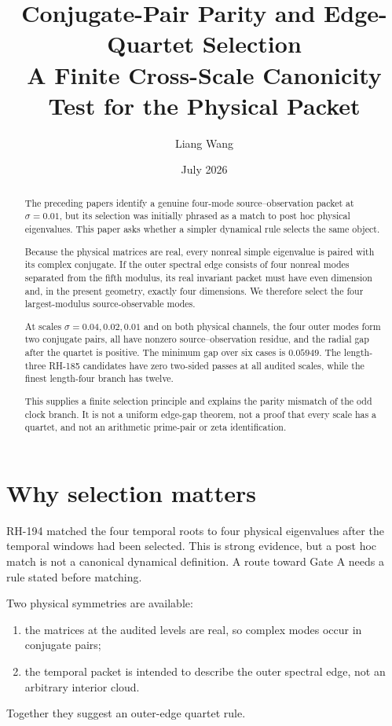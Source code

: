 \documentclass[12pt]{article}
\title{Conjugate-Pair Parity and Edge-Quartet Selection\\
\large A Finite Cross-Scale Canonicity Test for the Physical Packet}
\author{Liang Wang}
\date{July 2026}
\theoremstyle{remark}
\begin{document}
\maketitle

\begin{abstract}
The preceding papers identify a genuine four-mode source--observation packet
at $\sigma=0.01$, but its selection was initially phrased as a match to
post hoc physical eigenvalues.  This paper asks whether a simpler dynamical
rule selects the same object.

Because the physical matrices are real, every nonreal simple eigenvalue is
paired with its complex conjugate.  If the outer spectral edge consists of
four nonreal modes separated from the fifth modulus, its real invariant
packet must have even dimension and, in the present geometry, exactly four
dimensions.  We therefore select the four largest-modulus source-observable
modes.

At scales $\sigma=0.04,0.02,0.01$ and on both physical channels, the four
outer modes form two conjugate pairs, all have nonzero source--observation
residue, and the radial gap after the quartet is positive.  The minimum gap
over six cases is $0.05949$.  The length-three RH-185 candidates have zero
two-sided passes at all audited scales, while the finest length-four branch
has twelve.

This supplies a finite selection principle and explains the parity mismatch
of the odd clock branch.  It is not a uniform edge-gap theorem, not a proof
that every scale has a quartet, and not an arithmetic prime-pair or zeta
identification.
\end{abstract}

\section{Why selection matters}

RH-194 matched the four temporal roots to four physical eigenvalues after the
temporal windows had been selected.  This is strong evidence, but a
post hoc match is not a canonical dynamical definition.  A route toward Gate
A needs a rule stated before matching.

Two physical symmetries are available:
\begin{enumerate}[leftmargin=2em]
\item the matrices at the audited levels are real, so complex modes occur in
 conjugate pairs;
\item the temporal packet is intended to describe the outer spectral edge,
 not an arbitrary interior cloud.
\end{enumerate}
Together they suggest an outer-edge quartet rule.
\end{document}
